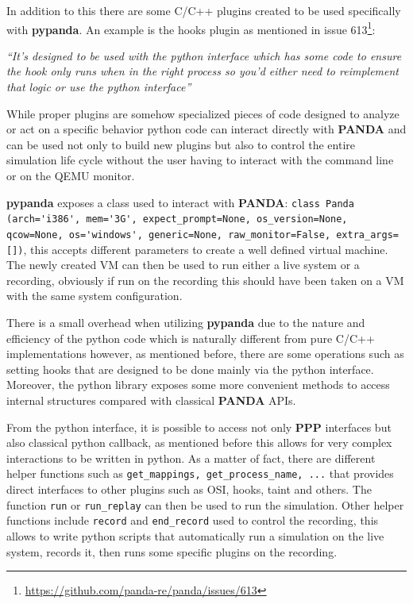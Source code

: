 In addition to this there are some C/C++ plugins created to be used specifically with \textbf{pypanda}. An example is the hooks plugin as mentioned in issue 613\footnote{\url{https://github.com/panda-re/panda/issues/613}}:

\textit{``It's designed to be used with the python interface which has some code to ensure the hook only runs when in the right process so you'd either need to reimplement that logic or use the python interface''}

While proper plugins are somehow specialized pieces of code designed to analyze or act on a specific behavior python code can interact directly with \textbf{PANDA} and can be used not only to build new plugins but also to control the entire simulation life cycle without the user having to interact with the command line or on the QEMU monitor.

\textbf{pypanda} exposes a class used to interact with \textbf{PANDA}: \lstinline{class Panda (arch='i386', mem='3G', expect_prompt=None, os_version=None, qcow=None, os='windows', generic=None, raw_monitor=False, extra_args=[])}, this accepts different parameters to create a well defined virtual machine. The newly created VM can then be used to run either a live system or a recording, obviously if run on the recording this should have been taken on a VM with the same system configuration. 

There is a small overhead when utilizing \textbf{pypanda} due to the nature and efficiency of the python code which is naturally different from pure C/C++ implementations however, as mentioned before, there are some operations such as setting hooks that are designed to be done mainly via the python interface. Moreover, the python library exposes some more convenient methods to access internal structures compared with classical \textbf{PANDA} APIs. 

From the python interface, it is possible to access not only \textbf{PPP} interfaces but also classical python callback, as mentioned before this allows for very complex interactions to be written in python. As a matter of fact, there are different helper functions such as \lstinline{get_mappings, get_process_name, ...} that provides direct interfaces to other plugins such as OSI, hooks, taint and others. The function \lstinline{run} or \lstinline{run_replay} can then be used to run the simulation. Other helper functions include \lstinline{record} and \lstinline{end_record} used to control the recording, this allows to write python scripts that automatically run a simulation on the live system, records it, then runs some specific plugins on the recording. 

